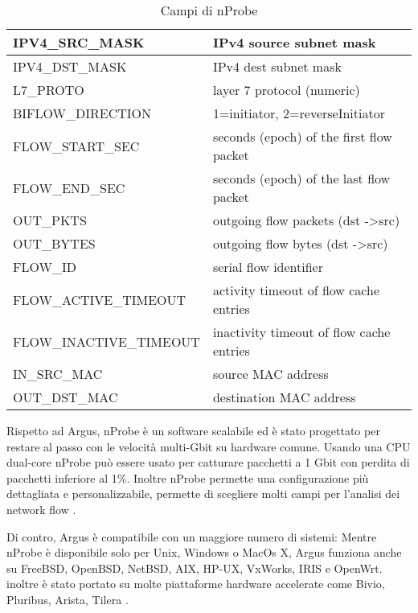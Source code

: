 \documentclass[../main.tex]{subfiles}
\begin{document}
\begin{table}[H]
\begin{tabular}{|l|l|}
IPV4\_SRC\_MASK                      & IPv4 source subnet mask                       \\ \hline
IPV4\_DST\_MASK                      & IPv4 dest subnet mask                         \\ \hline
L7\_PROTO                            & layer 7 protocol (numeric)                    \\ \hline
BIFLOW\_DIRECTION                    & 1=initiator, 2=reverseInitiator               \\ \hline
FLOW\_START\_SEC                     & seconds (epoch) of the first flow packet      \\ \hline
FLOW\_END\_SEC                       & seconds (epoch) of the last flow packet       \\ \hline
OUT\_PKTS                            & outgoing flow packets (dst -\textgreater src) \\ \hline
OUT\_BYTES                           & outgoing flow bytes (dst -\textgreater src)   \\ \hline
FLOW\_ID                             & serial flow identifier                        \\ \hline
FLOW\_ACTIVE\_TIMEOUT                & activity timeout of flow cache entries        \\ \hline
FLOW\_INACTIVE\_TIMEOUT              & inactivity timeout of flow cache entries      \\ \hline
IN\_SRC\_MAC                         & source MAC address                            \\ \hline
OUT\_DST\_MAC                        & destination MAC address                       \\ \hline
\end{tabular}\par
				\caption{Campi di nProbe}
\label{table:campiNprobe}
\end{table}

Rispetto ad Argus, nProbe è un software scalabile ed è stato progettato per restare al passo con le velocità multi-Gbit su hardware comune. Usando una CPU dual-core nProbe può essere usato per catturare pacchetti a 1 Gbit con perdita di pacchetti inferiore al 1\%. Inoltre nProbe permette una configurazione più dettagliata e personalizzabile, permette di scegliere molti campi per l'analisi dei network flow \cite{nProbe}.

Di contro, Argus è compatibile con un maggiore numero di sistemi: Mentre nProbe è disponibile solo per Unix, Windows o MacOs X, Argus funziona anche su FreeBSD, OpenBSD, NetBSD, AIX, HP-UX, VxWorks, IRIS e OpenWrt. inoltre è stato portato su molte piattaforme hardware accelerate come Bivio, Pluribus, Arista, Tilera \cite{Argus}. 
\end{document}
